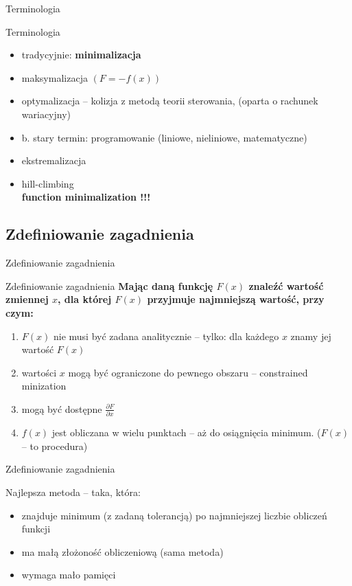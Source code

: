   \begin{frame}{Terminologia}
    \begin{block}{Terminologia}
      \begin{itemize}
        \item tradycyjnie: \textbf{minimalizacja}
        \item maksymalizacja $(F = -f(x))$
        \item optymalizacja -- kolizja z metodą teorii
        sterowania, (oparta o rachunek wariacyjny)
        \item b. stary termin: programowanie (liniowe,
        nieliniowe, matematyczne)
        \item ekstremalizacja
        \item hill-climbing \\
        \textbf{function minimalization !!!}
      \end{itemize}
    \end{block}
  \end{frame}

\subsection{Zdefiniowanie zagadnienia}

  \begin{frame}{Zdefiniowanie zagadnienia}
    \begin{block}{Zdefiniowanie zagadnienia}
      \textbf{Mając daną funkcję $ F(x) $ znaleźć wartość
      zmiennej $ x $, dla której $ F(x) $ przyjmuje
      najmniejszą wartość, przy czym:}
      \begin{enumerate}
        \item $ F(x) $ nie musi być zadana analitycznie --
        tylko: dla każdego $ x $ znamy jej wartość $ F(x) $
        \item wartości $ x $ mogą być ograniczone do pewnego
        obszaru -- constrained minization
        \item mogą być dostępne $ \frac{\partial F}{\partial x} $
        \item $ f(x) $ jest obliczana w wielu punktach --
        aż do osiągnięcia minimum. ($ F(x) $ -- to procedura)
      \end{enumerate}
    \end{block}
  \end{frame}

  \begin{frame}{Zdefiniowanie zagadnienia}
    \begin{block}{Najlepsza metoda -- taka, która:}
      \begin{itemize}
        \item znajduje minimum (z zadaną tolerancją)
        po najmniejszej liczbie obliczeń funkcji
        \item ma małą złożoność obliczeniową (sama
        metoda)
        \item wymaga mało pamięci
      \end{itemize}
    \end{block}
  \end{frame}

